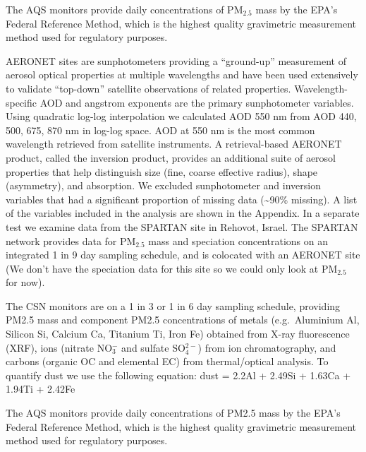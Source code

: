 \documentclass[, manuscript]{copernicus}
\begin{document}
The AQS monitors provide daily concentrations of PM\(_{2.5}\) mass by
the EPA's Federal Reference Method, which is the highest quality
gravimetric measurement method used for regulatory purposes.

AERONET sites are sunphotometers providing a ``ground-up'' measurement
of aerosol optical properties at multiple wavelengths and have been used
extensively to validate ``top-down'' satellite observations of related
properties. Wavelength-specific AOD and angstrom exponents are the
primary sunphotometer variables. Using quadratic log-log interpolation
we calculated AOD 550 nm from AOD 440, 500, 675, 870 nm in log-log
space. AOD at 550 nm is the most common wavelength retrieved from
satellite instruments. A retrieval-based AERONET product, called the
inversion product, provides an additional suite of aerosol properties
that help distinguish size (fine, coarse effective radius), shape
(asymmetry), and absorption. We excluded sunphotometer and inversion
variables that had a significant proportion of missing data
(\textasciitilde{}90\% missing). A list of the variables included in the
analysis are shown in the Appendix. In a separate test we examine data
from the SPARTAN site in Rehovot, Israel. The SPARTAN network provides
data for PM\(_{2.5}\) mass and speciation concentrations on an
integrated 1 in 9 day sampling schedule, and is colocated with an
AERONET site (We don't have the speciation data for this site so we
could only look at PM\(_{2.5}\) for now).

The CSN monitors are on a 1 in 3 or 1 in 6 day sampling schedule,
providing PM2.5 mass and component PM2.5 concentrations of metals
(e.g.~Aluminium Al, Silicon Si, Calcium Ca, Titanium Ti, Iron Fe)
obtained from X-ray fluorescence (XRF), ions (nitrate NO\(_{3}^-\) and
sulfate SO\(_4^{2-}\)) from ion chromatography, and carbons (organic OC
and elemental EC) from thermal/optical analysis. To quantify dust we use
the following equation: dust = 2.2Al + 2.49Si + 1.63Ca + 1.94Ti + 2.42Fe

The AQS monitors provide daily concentrations of PM2.5 mass by the EPA's
Federal Reference Method, which is the highest quality gravimetric
measurement method used for regulatory purposes.
\end{document}
